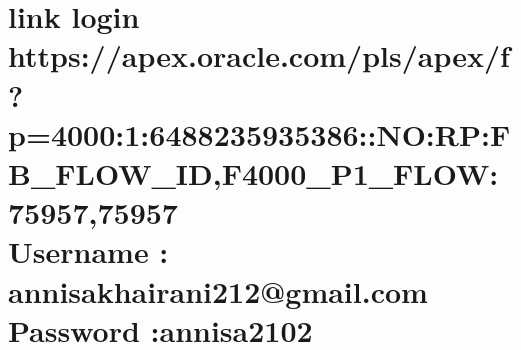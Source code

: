 \documentclass{article}
\begin{document}

\section{link login  https://apex.oracle.com/pls/apex/f?p=4000:1:6488235935386::NO:RP:FB_FLOW_ID,F4000_P1_FLOW:75957,75957 \\
Username : annisakhairani212@gmail.com \\
Password :annisa2102 }
\end{document}
